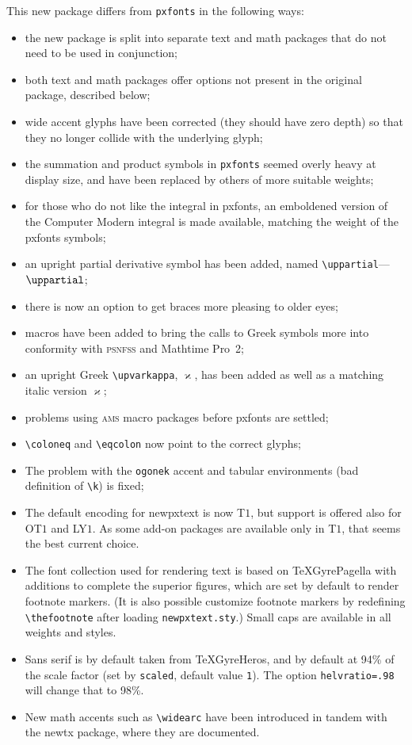 \documentclass[11pt]{article}
\begin{document}
This new package differs from {\tt pxfonts} in the following ways:
\begin{itemize}
\item
the new package is split into separate text and math packages that do not need to be used in conjunction;
\item both text and math packages offer options not present in the original package, described below;\item wide accent glyphs have been corrected (they should have zero depth) so that they no longer collide with the underlying glyph;
\item the summation and product symbols in {\tt pxfonts} seemed overly heavy at display size, and have been replaced by others of more suitable weights;
\item for those who do not like the integral in \textsf{pxfonts}, an emboldened version of the Computer Modern integral is made available, matching the weight of the \textsf{pxfonts} symbols;
\item an upright partial derivative symbol has been added, named \verb|\uppartial|---$\uppartial$;
\item there is now an option to get braces more pleasing to older eyes;
\item macros have been added to bring the calls to Greek symbols more into conformity with \textsc{psnfss} and Mathtime Pro~2;
\item an upright Greek \verb|\upvarkappa|, $\upvarkappa$, has been added as well as a matching italic version $\varkappa$;
\item problems using \textsc{ams} macro packages before \textsf{pxfonts} are settled;
\item \verb|\coloneq| and \verb|\eqcolon| now point to the correct glyphs;
\item The problem with the {\tt ogonek} accent  and tabular environments (bad definition of \verb|\k|) is fixed;
\item The default encoding for \textsf{newpxtext} is now T$1$, but support is offered also for OT$1$ and LY$1$. As some add-on packages are available only in T$1$, that seems the best current choice.
\item The font collection used for rendering text is based on TeXGyrePagella with additions to complete the superior figures, which are set by default to render footnote markers. (It is also possible customize footnote markers by redefining \verb|\thefootnote| after loading {\tt newpxtext.sty}.) Small caps are available in all weights and styles.
\item Sans serif is by default taken from TeXGyreHeros, and by default at 94\% of the scale factor (set by {\tt scaled}, default value {\tt1}). The option {\tt helvratio=.98} will change that to 98\%.
\item New math accents such as \verb|\widearc| have been introduced in tandem with the newtx package, where they are documented.
\end{itemize}
\end{document}

